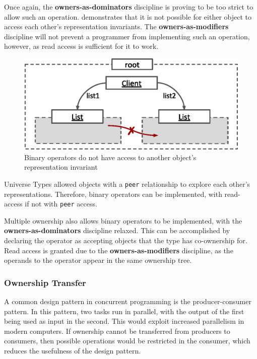 \documentclass{acm_proc_article-sp}
\begin{document}
Once again, the \textbf{owners-as-dominators} discipline is proving to be too
strict to allow such an operation.  demonstrates
that it is not possible for either object to access each other's representation
invariants. The \textbf{owners-as-modifiers} discipline will not prevent a
programmer from implementing such an operation, however, as read access is
sufficient for it to work.

\begin{figure}[b]
	\centering
	\includegraphics{binary-fail.eps}
	\caption{Binary operators do not have access to another object's
		representation invariant}
	\label{fig:binary-operators}
\end{figure}

Universe Types allowed objects with a \lstinline|peer| \cite{dietl11gut}
relationship to explore each other's representations. Therefore, binary
operators can be implemented, with read-access if not with \lstinline|peer|
access.

Multiple ownership also allows binary operators to be implemented, with the
\textbf{owners-as-dominators} discipline relaxed.  This can be accomplished by
declaring the operator as accepting objects that the type has co-ownership for.
Read access is granted due to the \textbf{owners-as-modifiers} discipline, as
the operands to the operator appear in the same ownership tree.


\subsubsection{Ownership Transfer}
\label{subsubsec:ownership_transfer}

A common design pattern in concurrent programming is the producer-consumer
pattern. In this pattern, two tasks run in parallel, with the output of the
first being used as input in the second. This would exploit increased
parallelism in modern computers. If ownership cannot be transferred from
producers to consumers, then possible operations would be restricted in the
consumer, which reduces the usefulness of the design pattern.
\end{document}
